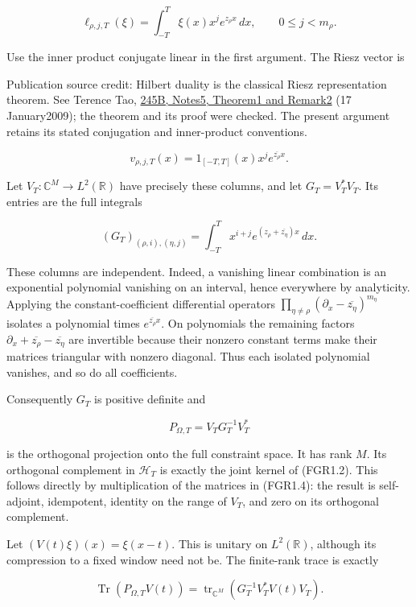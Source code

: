 \[
 \ell_{\rho,j,T}(\xi)=\int_{-T}^T \xi(x)x^j e^{z_\rho x}\,dx,
 \qquad 0\leq j<m_\rho.
\tag{FGR1.2}
\]

Use the inner product conjugate linear in the first argument. The Riesz
vector is

Publication source credit: Hilbert duality is the classical Riesz
representation theorem. See Terence Tao,
\href{https://terrytao.wordpress.com/2009/01/17/254a-notes-5-hilbert-spaces/}{245B,
Notes5, Theorem1 and Remark2} (17 January2009); the theorem and its
proof were checked. The present argument retains its stated conjugation
and inner-product conventions.

\[
 v_{\rho,j,T}(x)=1_{[-T,T]}(x)x^j e^{\overline{z_\rho}x}.
\]

Let \(V_T:\mathbb C^M\to L^2(\mathbb R)\) have precisely these columns,
and let \(G_T=V_T^*V_T\). Its entries are the full integrals

\[
 (G_T)_{(\rho,i),(\eta,j)}
 =\int_{-T}^T x^{i+j}e^{(z_\rho+\overline{z_\eta})x}\,dx.
\tag{FGR1.3}
\]

These columns are independent. Indeed, a vanishing linear combination is
an exponential polynomial vanishing on an interval, hence everywhere by
analyticity. Applying the constant-coefficient differential operators
\(\prod_{\eta\ne\rho}(\partial_x-\overline{z_\eta})^{m_\eta}\) isolates
a polynomial times \(e^{\overline{z_\rho}x}\). On polynomials the
remaining factors \(\partial_x+\overline{z_\rho}-\overline{z_\eta}\) are
invertible because their nonzero constant terms make their matrices
triangular with nonzero diagonal. Thus each isolated polynomial
vanishes, and so do all coefficients.

Consequently \(G_T\) is positive definite and

\[
 P_{\Omega,T}=V_TG_T^{-1}V_T^*
\tag{FGR1.4}
\]

is the orthogonal projection onto the full constraint space. It has rank
\(M\). Its orthogonal complement in \(\mathscr H_T\) is exactly the
joint kernel of (FGR1.2). This follows directly by multiplication of the
matrices in (FGR1.4): the result is self-adjoint, idempotent, identity
on the range of \(V_T\), and zero on its orthogonal complement.

Let \((V(t)\xi)(x)=\xi(x-t)\). This is unitary on \(L^2(\mathbb R)\),
although its compression to a fixed window need not be. The finite-rank
trace is exactly

\[
 \operatorname{Tr}(P_{\Omega,T}V(t))
 =\operatorname{tr}_{\mathbb C^M}
 \left(G_T^{-1}V_T^*V(t)V_T\right).
\tag{FGR1.5}
\]

